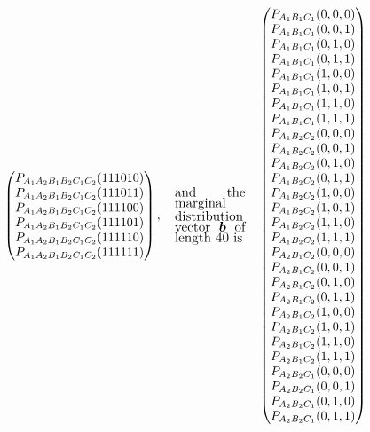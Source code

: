 \documentclass[aps,english,10pt,superscriptaddress,onecolumn,twoside,longbibliography,pra,floatfix,fleqn,nofootinbib]{revtex4-1}%
\theoremstyle{definition}
\newcommand{\p}[2][]{{P_{#1}}\parenths{#2}}
\DeclarePairedDelimiter{\parenths}{\lparen}{\rparen}
\begin{document}
\begin{align}
{\begin{pmatrix}
 \p[A_1 A_2 B_1 B_2 C_1 C_2]{1 1 1 0 1 0} \\
 \p[A_1 A_2 B_1 B_2 C_1 C_2]{1 1 1 0 1 1} \\
 \p[A_1 A_2 B_1 B_2 C_1 C_2]{1 1 1 1 0 0} \\
 \p[A_1 A_2 B_1 B_2 C_1 C_2]{1 1 1 1 0 1} \\
 \p[A_1 A_2 B_1 B_2 C_1 C_2]{1 1 1 1 1 0} \\
 \p[A_1 A_2 B_1 B_2 C_1 C_2]{1 1 1 1 1 1} \\
\end{pmatrix},\quad
\parbox{2cm}{\fontsize{11pt}{0pt}\selectfont
and the marginal distribution vector $\bm{b}$ of length 40 is 
}\quad
\begin{pmatrix}
 \p[A_1 B_1 C_1]{0,0,0} \\
 \p[A_1 B_1 C_1]{0,0,1} \\
 \p[A_1 B_1 C_1]{0,1,0} \\
 \p[A_1 B_1 C_1]{0,1,1} \\
 \p[A_1 B_1 C_1]{1,0,0} \\
 \p[A_1 B_1 C_1]{1,0,1} \\
 \p[A_1 B_1 C_1]{1,1,0} \\
 \p[A_1 B_1 C_1]{1,1,1} \\
 \p[A_1 B_2 C_2]{0,0,0} \\
 \p[A_1 B_2 C_2]{0,0,1} \\
 \p[A_1 B_2 C_2]{0,1,0} \\
 \p[A_1 B_2 C_2]{0,1,1} \\
 \p[A_1 B_2 C_2]{1,0,0} \\
 \p[A_1 B_2 C_2]{1,0,1} \\
 \p[A_1 B_2 C_2]{1,1,0} \\
 \p[A_1 B_2 C_2]{1,1,1} \\
 \p[A_2 B_1 C_2]{0,0,0} \\
 \p[A_2 B_1 C_2]{0,0,1} \\
 \p[A_2 B_1 C_2]{0,1,0} \\
 \p[A_2 B_1 C_2]{0,1,1} \\
 \p[A_2 B_1 C_2]{1,0,0} \\
 \p[A_2 B_1 C_2]{1,0,1} \\
 \p[A_2 B_1 C_2]{1,1,0} \\
 \p[A_2 B_1 C_2]{1,1,1} \\
 \p[A_2 B_2 C_1]{0,0,0} \\
 \p[A_2 B_2 C_1]{0,0,1} \\
 \p[A_2 B_2 C_1]{0,1,0} \\
 \p[A_2 B_2 C_1]{0,1,1} \\

\end{pmatrix}}
\end{align}
\end{document}

